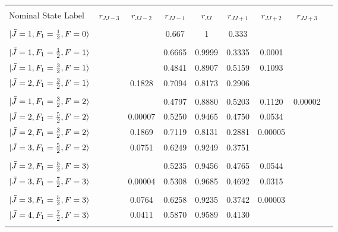 \documentclass[8pt]{article}
\begin{document}
\begin{table}[]
	\scriptsize
	
	\begin{tabular}{l l c c c c c c r}
		\hline
		\hline
		\\
		Nominal State Label  & $r_{JJ-3}$ &$r_{JJ-2}$ & $r_{JJ-1}$ & $r_{JJ}$ & $r_{JJ+1}$ & $r_{JJ+2}$ & $r_{JJ+3}$ \\
		\hline
		\\
		$\ket{\tilde{J}  = 1, F_1 = \frac{1}{2}, F = 0}$ & &  & 0.667 & 1 & 0.333 & &  \\ 
		\\
		$\ket{\tilde{J}  = 1, F_1 = \frac{1}{2}, F = 1}$ & &  & 0.6665 & 0.9999 & 0.3335 & 0.0001 &   \\
		$\ket{\tilde{J}  = 1, F_1 = \frac{3}{2}, F = 1}$ &  &  & 0.4841 & 0.8907 & 0.5159 & 0.1093 &   \\
		$\ket{\tilde{J}  = 2, F_1 = \frac{3}{2}, F = 1}$ & & 0.1828 & 0.7094 & 0.8173 & 0.2906 & &    \\
		\\
		$\ket{\tilde{J}  = 1, F_1 = \frac{3}{2}, F = 2}$ & & & 0.4797 & 0.8880 & 0.5203 & 0.1120 & 0.00002 \\
		
		$\ket{\tilde{J}  = 2, F_1 = \frac{5}{2}, F = 2}$ & & 0.00007 & 0.5250 & 0.9465 & 0.4750 & 0.0534 &  \\
		
		$\ket{\tilde{J}  = 2, F_1 = \frac{3}{2}, F = 2}$ & & 0.1869 & 0.7119 & 0.8131 & 0.2881 & 0.00005 &  \\
		
		$\ket{\tilde{J}  = 3, F_1 = \frac{5}{2}, F = 2}$ & & 0.0751 & 0.6249 & 0.9249 & 0.3751 &  &  \\
		\\
		
		$\ket{\tilde{J}  = 2, F_1 = \frac{5}{2}, F = 3}$ & & & 0.5235 & 0.9456 & 0.4765 & 0.0544 &  \\
		
		$\ket{\tilde{J}  = 3, F_1 = \frac{7}{2}, F = 3}$ & & 0.00004 & 0.5308 & 0.9685 & 0.4692 & 0.0315 &  \\  \\
		
		$\ket{\tilde{J}  = 3, F_1 = \frac{5}{2}, F = 3}$ & & 0.0764 & 0.6258 & 0.9235 & 0.3742 & 0.00003 &  \\
		
		$\ket{\tilde{J}  = 4, F_1 = \frac{7}{2}, F = 3}$ & & 0.0411 & 0.5870 & 0.9589 & 0.4130 & &  \\
		\\
		\hline
		\hline
	\end{tabular}
\end{table}
\end{document}
